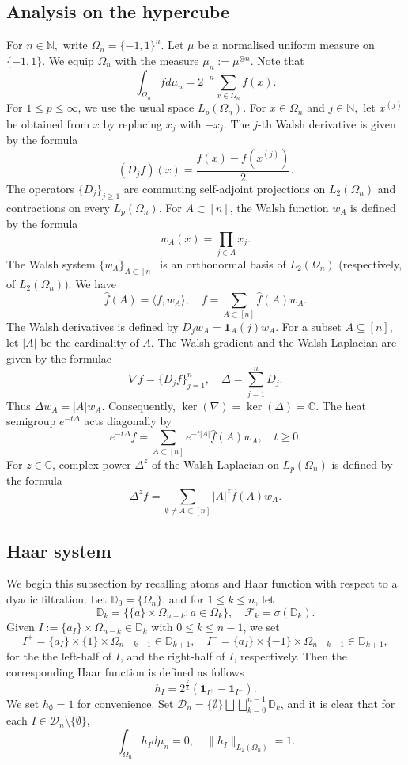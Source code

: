 \documentclass{amsart}
\numberwithin{equation}{section}
\theoremstyle{definition}
\theoremstyle{remark}
\newcommand{\1}{\mathbf 1}
\begin{document}
\subsection{Analysis on the hypercube}
For $n\in\mathbb{N},$ write $\Omega_{n}=\{-1,1\}^{n}.$ Let $\mu$ be a normalised uniform measure on $\{-1,1\}.$  We equip $\Omega_n$ with the measure $\mu_n:=\mu^{\otimes n}.$ Note that
$$\int_{\Omega_n}fd\mu_n=2^{-n}\sum_{x\in\Omega_n}f(x).$$
For $1\leq p\leq\infty$, we use the usual space $L_p(\Omega_n)$. For $x\in\Omega_{n}$ and $j\in\mathbb{N},$ let $x^{(j)}$ be obtained from $x$ by replacing $x_j$ with $-x_j.$ The $j$-th Walsh derivative is given by the formula
$$(D_jf)(x)=\frac{f(x)-f(x^{(j)})}{2}.$$
The operators $\{D_j\}_{j\geq1}$ are commuting self-adjoint projections on
$L_2(\Omega_{n})$ and contractions on every $L_p(\Omega_{n}).$ For $A\subset [n]$, the Walsh function $w_A$ is defined by the formula
$$w_A(x)=\prod_{j\in A}x_j.$$
The Walsh system $\{w_A\}_{A\subset [n]}$ is an orthonormal basis of $L_2(\Omega_n)$ (respectively, of $L_2(\Omega_{n})$). We have
$$\widehat{f}(A)=\langle f,w_A\rangle,\quad f=\sum_{A\subset [n]}\widehat{f}(A)w_A.$$
The Walsh derivatives is defined by $D_jw_{A}=\1_A(j)w_A$. For a subset $A\subseteq [n],$ let $|A|$ be the cardinality of $A.$ The Walsh gradient and the Walsh Laplacian are given by the formulae
$$\nabla f=\{D_jf\}_{j=1}^{n},\quad \Delta=\sum_{j=1}^nD_j.$$
Thus $\Delta w_A=|A|w_A.$ Consequently, $\ker(\nabla)=\ker(\Delta)=\mathbb{C}$. The heat semigroup $e^{-t\Delta}$ acts diagonally by
$$e^{-t\Delta}f=\sum_{A\subset[n]}e^{-t|A|}\widehat{f}(A)w_A,\quad t\geq0.$$
For $z\in\mathbb{C}$, complex power $\Delta^z$ of the Walsh Laplacian on $L_p(\Omega_n)$ is defined by the formula
$$\Delta^zf=\sum_{\emptyset\neq A\subset[n]}|A|^z\widehat{f}(A)w_A.$$


\subsection{Haar system}

We begin this subsection by recalling atoms and Haar function with respect to a dyadic filtration. 
Let $\mathbb{D}_0=\{\Omega_n\}$, and for $1\leq k\leq n$, let 
\[\mathbb{D}_k=\{\{a\}\times \Omega_{n-k}: a\in \Omega_k\},\quad \mathcal{F}_k=\sigma(\mathbb{D}_k).\]
Given $I:=\{a_I\}\times \Omega_{n-k}\in \mathbb{D}_k$ with $0\leq k\leq n-1$, we set 
\[I^+= \{a_I\}\times \{1\}\times\Omega_{n-k-1}\in \mathbb{D}_{k+1},\quad I^-= \{a_I\}\times \{-1\}\times \Omega_{n-k-1}\in \mathbb{D}_{k+1},\]
for the the left-half of $I$, and the right-half of $I$, respectively. Then  the corresponding Haar function is defined as follows
\[
h_I=2^{\frac{k}{2}}\left(\1_{I^+}-\1_{I^{-}}\right).
\]
We set $h_{\emptyset}=1$ for convenience. Set $\mathcal{D}_n=\{\emptyset\}\bigsqcup\bigsqcup_{k=0}^{n-1}\mathbb{D}_k$, and it is clear that for each $I\in \mathcal{D}_n\setminus \{\emptyset\}$,
\[\int_{\Omega_n}h_I d\mu_n =0, \quad \|h_I\|_{L_2(\Omega_n)}=1.\]
\end{document}

